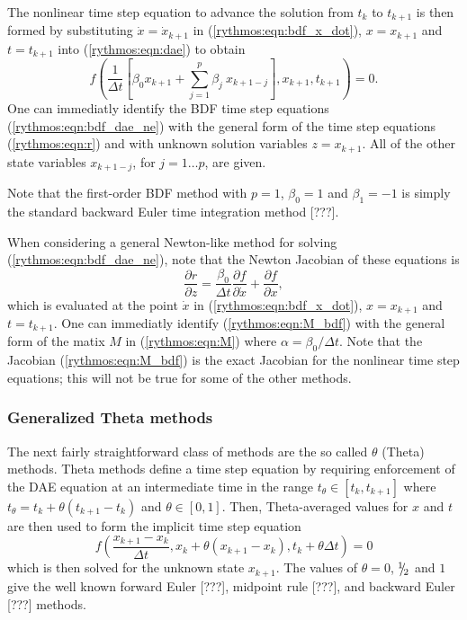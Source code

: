 \documentclass[pdf,ps2pdf,11pt]{SANDreport}
\begin{document}
The nonlinear time step equation to advance the solution from $t_k$ to
$t_{k+1}$ is then formed by substituting $\dot{x} = \dot{x}_{k+1}$ in
(\ref{rythmos:eqn:bdf_x_dot}), $x = x_{k+1}$ and $t = t_{k+1}$ into
(\ref{rythmos:eqn:dae}) to obtain
%
\begin{equation}
f\left( \frac{1}{\Delta t} \left[ \beta_0 x_{k+1} + \sum_{j=1}^{p} \beta_j \: x_{k+1-j} \right],x_{k+1},t_{k+1}\right) = 0.
\label{rythmos:eqn:bdf_dae_ne}
\end{equation}
%
One can immediatly identify the BDF time step equations
(\ref{rythmos:eqn:bdf_dae_ne}) with the general form of the time step
equations (\ref{rythmos:eqn:r}) and with unknown solution variables $z =
x_{k+1}$.  All of the other state variables $x_{k+1-j}$, for $j = 1 {}\ldots
p$, are given.

Note that the first-order BDF method with $p=1$, $\beta_0 = 1$ and $\beta_1 =
-1$ is simply the standard backward Euler time integration method [???].

When considering a general Newton-like method for solving
(\ref{rythmos:eqn:bdf_dae_ne}), note that the Newton Jacobian of these
equations is
%
\begin{equation}
\frac{\partial r}{\partial z}
= \frac{\beta_0}{\Delta t} \frac{\partial f}{\partial \dot{x}} + \frac{\partial f}{\partial x},
\label{rythmos:eqn:M_bdf}
\end{equation}
%
which is evaluated at the point $\dot{x}$ in (\ref{rythmos:eqn:bdf_x_dot}), $x
= x_{k+1}$ and $t = t_{k+1}$.  One can immediatly identify
(\ref{rythmos:eqn:M_bdf}) with the general form of the matix $M$ in
(\ref{rythmos:eqn:M}) where $\alpha = \beta_0 / \Delta t$.  Note that the
Jacobian (\ref{rythmos:eqn:M_bdf}) is the exact Jacobian for the nonlinear
time step equations; this will not be true for some of the other methods.

\subsubsection{Generalized Theta methods}

The next fairly straightforward class of methods are the so called $\theta$
(Theta) methods.  Theta methods define a time step equation by requiring
enforcement of the DAE equation at an intermediate time in the range
$t_{\theta} {}\in [t_k,t_{k+1}]$ where $t_{\theta} = t_k + \theta ( t_{k+1} -
t_k )$ and $\theta {}\in [0,1]$.  Then, Theta-averaged values for $x$ and $t$
are then used to form the implicit time step equation
%
\begin{equation}
f\left( \frac{x_{k+1} - x_{k}}{\Delta t},x_k + \theta ( x_{k+1} - x_{k} ), t_k + \theta \Delta t \right) = 0
\label{rythmos:eqn:theta_dae_ne}
\end{equation}
%
which is then solved for the unknown state $x_{k+1}$.  The values of $\theta =
0$, ${}^1 \!\! / \! {}_2$ and $1$ give the well known forward Euler [???], midpoint
rule [???], and backward Euler [???] methods.
\end{document}
